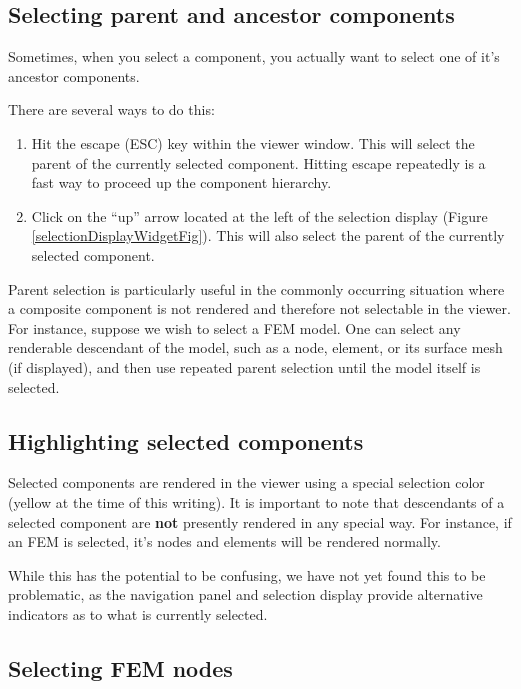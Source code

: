 \documentclass{article}
\begin{document}
\subsection{Selecting parent and ancestor components}
\label{selectingAncestorsSec}

Sometimes, when you select a component, you actually want to select
one of it's ancestor components. 

There are several ways to do this:

\begin{enumerate}

\item Hit the escape ({\sf ESC}) key within the viewer window. This
will select the parent of the currently selected component. Hitting
escape repeatedly is a fast way to proceed up the component hierarchy.

\item Click on the ``up'' arrow located at the left of the selection
display (Figure \ref{selectionDisplayWidgetFig}). This will also
select the parent of the currently selected component.

\end{enumerate}

Parent selection is particularly useful in the commonly occurring
situation where a composite component is not rendered and therefore
not selectable in the viewer. For instance, suppose we wish to select
a FEM model. One can select any renderable descendant of the model,
such as a node, element, or its surface mesh (if displayed), and then
use repeated parent selection until the model itself is selected.

\subsection{Highlighting selected components}

Selected components are rendered in the viewer using a special
selection color (yellow at the time of this writing). It is important
to note that descendants of a selected component are {\bf not} presently
rendered in any special way. For instance, if an FEM is selected, it's
nodes and elements will be rendered normally. 

While this has the potential to be confusing, we have not yet found
this to be problematic, as the navigation panel and selection display
provide alternative indicators as to what is currently selected.

\subsection{Selecting FEM nodes}
\end{document}
